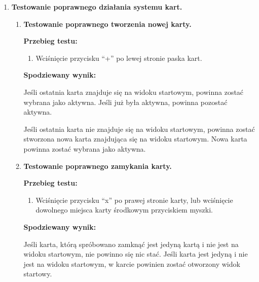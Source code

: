 \begin{enumerate}

    \item \textbf{Testowanie poprawnego działania systemu kart.}

        \begin{enumerate}

            \item \textbf{Testowanie poprawnego tworzenia nowej karty.}

                \textbf{Przebieg testu:}

                \begin{enumerate}

                    \item Wciśnięcie przycisku ``+'' po lewej stronie paska
                        kart.

                \end{enumerate}

                \textbf{Spodziewany wynik:}

                Jeśli ostatnia karta znajduje się na widoku startowym, powinna
                zostać wybrana jako aktywna. Jeśli już była aktywna, powinna
                pozostać aktywna.

                Jeśli ostatnia karta nie znajduje się na widoku startowym,
                powinna zostać stworzona nowa karta znajdująca się na widoku
                startowym. Nowa karta powinna zostać wybrana jako aktywna.

            \item \textbf{Testowanie poprawnego zamykania karty.}

                \textbf{Przebieg testu:}

                \begin{enumerate}

                    \item Wciśnięcie przycisku ``x'' po prawej stronie karty,
                        lub wciśnięcie dowolnego miejsca karty środkowym
                        przyciskiem myszki.

                \end{enumerate}

                \textbf{Spodziewany wynik:}

                Jeśli karta, którą spróbowano zamknąć jest jedyną kartą i nie
                jest na widoku startowym, nie powinno się nic stać. Jeśli karta
                jest jedyną i nie jest na widoku startowym, w karcie powinien
                zostać otworzony widok startowy.


\end{enumerate}
\end{enumerate}
